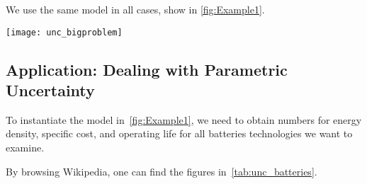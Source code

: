 We use the same model in all cases, show in \cref{fig:Example1}.
\begin{figure*}[b!]
    \centering
    \texttt{[image: unc\_bigproblem]}
    \caption{
        The semantics of the drone design exercises is the minimization of the  and  of the platform, subject to functionality constraints (, , ).
        We discuss how to introduce uncertainty in this framework, which allows, for example, to introduce parametric uncertainty in the definition of components properties (\eg, specific cost of batteries).
    }
    \label{fig:Example1}
\end{figure*}
\vfill\pagebreak
\subsection{Application: Dealing with Parametric Uncertainty\label{sec:Application-uncertainty}}

To instantiate the model in~\cref{fig:Example1}, we need to obtain numbers for energy density, specific cost, and operating life for all batteries technologies we want to examine.

By browsing Wikipedia, one can find the figures in~\cref{tab:unc_batteries}.

